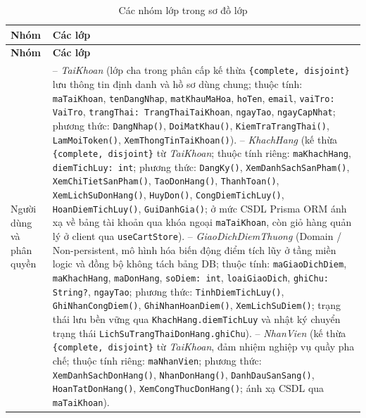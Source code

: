 \documentclass[12pt,a4paper]{report}
\begin{document}
\begin{longtable}{>{\raggedright\arraybackslash}p{3.8cm}>{\raggedright\arraybackslash}p{11.4cm}}
\caption{Các nhóm lớp trong sơ đồ lớp}\\
\hline
\rowcolor{gray!20} \textbf{Nhóm} & \textbf{Các lớp} \\
\hline
\endfirsthead
\hline
\rowcolor{gray!20} \textbf{Nhóm} & \textbf{Các lớp} \\
\hline
\endhead
Người dùng và phân quyền & -- \textit{TaiKhoan} (lớp cha trong phân cấp kế thừa \texttt{\{complete, disjoint\}} lưu thông tin định danh và hồ sơ dùng chung; thuộc tính: \texttt{maTaiKhoan}, \texttt{tenDangNhap}, \texttt{matKhauMaHoa}, \texttt{hoTen}, \texttt{email}, \texttt{vaiTro: VaiTro}, \texttt{trangThai: TrangThaiTaiKhoan}, \texttt{ngayTao}, \texttt{ngayCapNhat}; phương thức: \texttt{DangNhap()}, \texttt{DoiMatKhau()}, \texttt{KiemTraTrangThai()}, \texttt{LamMoiToken()}, \texttt{XemThongTinTaiKhoan()}). \newline
-- \textit{KhachHang} (kế thừa \texttt{\{complete, disjoint\}} từ \textit{TaiKhoan}; thuộc tính riêng: \texttt{maKhachHang}, \texttt{diemTichLuy: int}; phương thức: \texttt{DangKy()}, \texttt{XemDanhSachSanPham()}, \texttt{XemChiTietSanPham()}, \texttt{TaoDonHang()}, \texttt{ThanhToan()}, \texttt{XemLichSuDonHang()}, \texttt{HuyDon()}, \texttt{CongDiemTichLuy()}, \texttt{HoanDiemTichLuy()}, \texttt{GuiDanhGia()}; ở mức CSDL Prisma ORM ánh xạ về bảng tài khoản qua khóa ngoại \texttt{maTaiKhoan}, còn giỏ hàng quản lý ở client qua \texttt{useCartStore}). \newline
-- \textit{GiaoDichDiemThuong} (\guillemotleft{}Domain / Non-persistent\guillemotright{}, mô hình hóa biến động điểm tích lũy ở tầng miền logic và đồng bộ không tách bảng DB; thuộc tính: \texttt{maGiaoDichDiem}, \texttt{maKhachHang}, \texttt{maDonHang}, \texttt{soDiem: int}, \texttt{loaiGiaoDich}, \texttt{ghiChu: String?}, \texttt{ngayTao}; phương thức: \texttt{TinhDiemTichLuy()}, \texttt{GhiNhanCongDiem()}, \texttt{GhiNhanHoanDiem()}, \texttt{XemLichSuDiem()}; trạng thái lưu bền vững qua \texttt{KhachHang.diemTichLuy} và nhật ký chuyển trạng thái \texttt{LichSuTrangThaiDonHang.ghiChu}). \newline
-- \textit{NhanVien} (kế thừa \texttt{\{complete, disjoint\}} từ \textit{TaiKhoan}, đảm nhiệm nghiệp vụ quầy pha chế; thuộc tính riêng: \texttt{maNhanVien}; phương thức: \texttt{XemDanhSachDonHang()}, \texttt{NhanDonHang()}, \texttt{DanhDauSanSang()}, \texttt{HoanTatDonHang()}, \texttt{XemCongThucDonHang()}; ánh xạ CSDL qua \texttt{maTaiKhoan}). \newline

\end{longtable}
\end{document}
